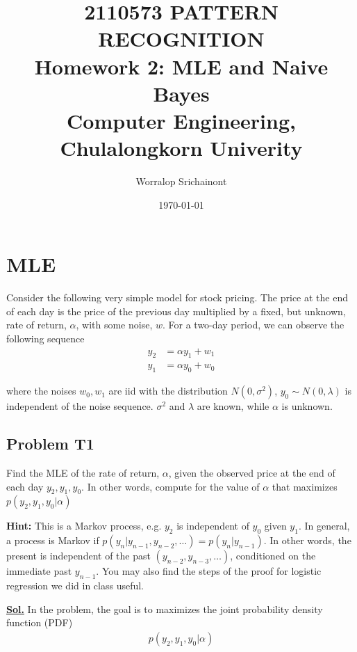 \documentclass[12pt, a4paper]{article}
\title {
	\textbf{2110573 PATTERN RECOGNITION} \\
    \vspace{1em}
	\Large{\textbf{Homework 2: MLE and Naive Bayes}} \\
    \vspace{0.5em}
    \large{Computer Engineering, Chulalongkorn Univerity}
}
\author{Worralop Srichainont}
\date{\today}
\newcommand{\sol}{\par\noindent\underline{\textbf{Sol.}} }
\begin{document}
    \maketitle
    \thispagestyle{empty}
    \clearpage

    \tableofcontents
    \thispagestyle{empty}
    \clearpage


    \section{MLE}
        Consider the following very simple model for stock pricing. The price at the end of each day is the price of the previous day multiplied by a fixed, but unknown, rate of return, $\alpha$, with some noise, $w$. For a two-day period, we can observe the following sequence
        \begin{align*}
            y_{2} &= \alpha y_{1} + w_{1} \\
            y_{1} &= \alpha y_{0} + w_{0}
        \end{align*}

        where the noises $w_0, w_1$ are iid with the distribution $N(0, \sigma^2)$, $y_0 \sim N(0, \lambda)$ is independent of the noise sequence. $\sigma^2$ and $\lambda$ are known, while $\alpha$ is unknown.

        \subsection{Problem T1}
            Find the MLE of the rate of return, $\alpha$, given the observed price at the end of each day $y_2, y_1, y_0$. In other words, compute for the value of $\alpha$ that maximizes $p(y_2, y_1, y_0|\alpha)$

            \vspace{1em}

            \textbf{Hint:} This is a Markov process, e.g. $y_2$ is independent of $y_0$ given $y_1$. In general, a process is Markov if $p(y_n|y_{n-1}, y_{n-2}, \dots) = p(y_n|y_{n-1})$. In other words, the present is independent of the past $(y_{n-2}, y_{n-3}, \dots)$, conditioned on the immediate past $y_{n-1}$. You may also find the steps of the proof for logistic regression we did in class useful.

            \vspace{1em}

            \sol In the problem, the goal is to maximizes the joint probability density function (PDF)
            \begin{align*}
                p(y_{2}, y_{1}, y_{0}|\alpha)
            \end{align*}
\end{document}
